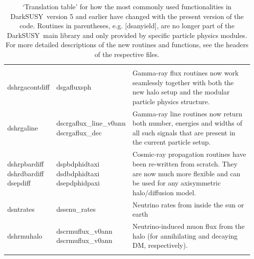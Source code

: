 \documentclass[a4paper,10pt,oneside]{book}
\newcommand{\code}[1]{\ft{#1}}
\newcommand{\ds}{{\sffamily DarkSUSY}}
\newcommand{\ft}[1]{\textsf{#1}}
\begin{document}
\begin{longtable}{ p{}  p{}  p{} }
\vspace*{1.5ex}\\
%
\code{dshrgacontdiff} & \code{dsgafluxsph} &  \parbox[t]{5.5cm}{Gamma-ray flux routines now work seamlessly together with both the new halo setup and the modular particle physics structure.}
\vspace*{1.5ex}\\
%
\code{dshrgaline} & \parbox[t]{4cm}{\code{dscrgaflux\_line\_v0ann}\\\code{dscrgaflux\_dec}} & \parbox[t]{5.5cm}{Gamma-ray line routines now return both number, energies and widths of all such signals that are present in the current particle setup.}
\vspace*{1.5ex}\\
%
\parbox[t]{4cm}{\code{dshrpbardiff}\\\code{dshrdbardiff}\\\code{dsepdiff}} 
& \parbox[t]{4cm}{\code{dspbdphidtaxi}\\\code{dsdbdphidtaxi}\\\code{dsepdphidpaxi}} 
&  \parbox[t]{5.5cm}{Cosmic-ray propagation routines have been re-written 
from scratch. They are now much more flexible and can be used for any axisymmetric halo/diffusion model.}
\vspace*{1.5ex}\\
%
\code{dsntrates} & \code{dssenu\_rates} &  \parbox[t]{5.5cm}{Neutrino rates from inside the sun or earth}
\vspace*{1.5ex}\\
%
\code{dshrmuhalo} &  \parbox[t]{4cm}{\code{dscrmuflux\_v0ann}\\\code{dscrmuflux\_v0ann}} 
&  \parbox[t]{5.5cm}{Neutrino-induced muon flux from the halo
(for annihilating and decaying DM, respectively).}
\vspace*{1.5ex}\\
%

\hline
\caption{`Translation table' for how the most commonly used functionalities in \ds\ version 5 and earlier have changed with the
present version of the code. Routines in parentheses, e.g.  [\code{dsanyield}], are no longer part of the \ds\ main library and only 
provided by specific particle physics modules. For more detailed descriptions of the new routines and functions, see the headers of the respective 
files. 
}
\label{tab:translation}
\end{longtable}
\end{document}
